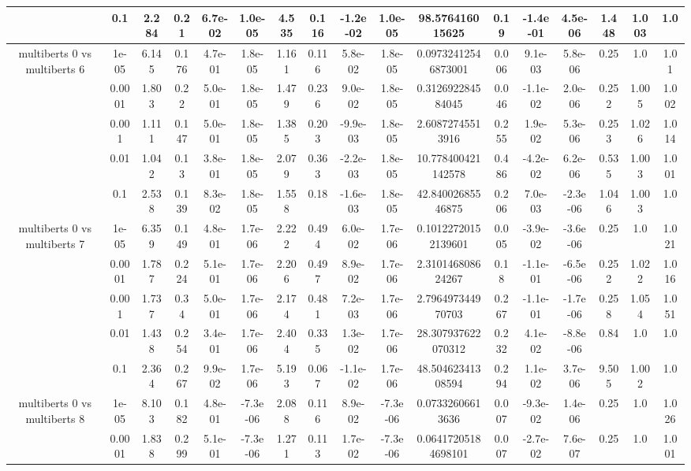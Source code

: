 \begin{tabular}{|c|c|c|c|c|c|c|c|c|c|c|c|c|c|c|c|c|}
 & 0.1 & 2.284 & 0.21 & 6.7e-02 & 1.0e-05 & 4.535 & 0.116 & -1.2e-02 & 1.0e-05 & 98.576416015625 & 0.19 & -1.4e-01 & 4.5e-06 & 1.448 & 1.003 & 1.0 \\
\hline
\multirow{5}{*}{multiberts 0 vs multiberts 6} & 1e-05 & 6.145 & 0.176 & 4.7e-01 & 1.8e-05 & 1.161 & 0.116 & 5.8e-02 & 1.8e-05 & 0.09732412546873001 & 0.006 & 9.1e-03 & 5.8e-06 & 0.25 & 1.0 & 1.01 \\
 & 0.0001 & 1.803 & 0.22 & 5.0e-01 & 1.8e-05 & 1.479 & 0.236 & 9.0e-02 & 1.8e-05 & 0.312692284584045 & 0.046 & -1.1e-02 & 2.0e-06 & 0.252 & 1.005 & 1.002 \\
 & 0.001 & 1.111 & 0.147 & 5.0e-01 & 1.8e-05 & 1.385 & 0.203 & -9.9e-03 & 1.8e-05 & 2.60872745513916 & 0.255 & 1.9e-02 & 5.3e-06 & 0.253 & 1.026 & 1.014 \\
 & 0.01 & 1.042 & 0.13 & 3.8e-01 & 1.8e-05 & 2.079 & 0.363 & -2.2e-03 & 1.8e-05 & 10.778400421142578 & 0.486 & -4.2e-02 & 6.2e-06 & 0.535 & 1.003 & 1.001 \\
 & 0.1 & 2.538 & 0.139 & 8.3e-02 & 1.8e-05 & 1.558 & 0.18 & -1.6e-03 & 1.8e-05 & 42.84002685546875 & 0.206 & 7.0e-03 & -2.3e-06 & 1.046 & 1.003 & 1.0 \\
\hline
\multirow{5}{*}{multiberts 0 vs multiberts 7} & 1e-05 & 6.359 & 0.149 & 4.8e-01 & 1.7e-06 & 2.222 & 0.494 & 6.0e-02 & 1.7e-06 & 0.10122720152139601 & 0.005 & -3.9e-02 & -3.6e-06 & 0.25 & 1.0 & 1.021 \\
 & 0.0001 & 1.787 & 0.224 & 5.1e-01 & 1.7e-06 & 2.206 & 0.497 & 8.9e-02 & 1.7e-06 & 2.310146808624267 & 0.18 & -1.1e-01 & -6.5e-06 & 0.252 & 1.022 & 1.016 \\
 & 0.001 & 1.737 & 0.34 & 5.0e-01 & 1.7e-06 & 2.174 & 0.481 & 7.2e-03 & 1.7e-06 & 2.796497344970703 & 0.267 & -1.1e-01 & -1.7e-06 & 0.258 & 1.054 & 1.051 \\
 & 0.01 & 1.438 & 0.254 & 3.4e-01 & 1.7e-06 & 2.404 & 0.335 & 1.3e-02 & 1.7e-06 & 28.307937622070312 & 0.232 & 4.1e-02 & -8.8e-06 & 0.84 & 1.0 & 1.0 \\
 & 0.1 & 2.364 & 0.267 & 9.9e-02 & 1.7e-06 & 5.193 & 0.067 & -1.1e-02 & 1.7e-06 & 48.50462341308594 & 0.294 & 1.1e-02 & 3.7e-06 & 9.505 & 1.002 & 1.0 \\
\hline
\multirow{5}{*}{multiberts 0 vs multiberts 8} & 1e-05 & 8.103 & 0.182 & 4.8e-01 & -7.3e-06 & 2.088 & 0.116 & 8.9e-02 & -7.3e-06 & 0.07332606613636 & 0.007 & -9.3e-02 & 1.4e-06 & 0.25 & 1.0 & 1.026 \\
 & 0.0001 & 1.838 & 0.299 & 5.1e-01 & -7.3e-06 & 1.271 & 0.113 & 1.7e-02 & -7.3e-06 & 0.06417205184698101 & 0.007 & -2.7e-02 & 7.6e-07 & 0.25 & 1.0 & 1.001 \\

\end{tabular}
